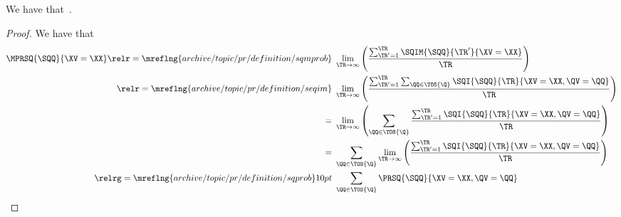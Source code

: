 \begin{proposition}
  We have that\ \mprsqexprprop.%
\end{proposition}

\begin{proof}
  We have that
  \begin{align*}
  \MPRSQ{\SQQ}{\XV = \XX}
                    \relr = {\mreflng{archive/topic/pr/definition/sqmprob}} \ & 
                    \lim_{\TR \rightarrow \infty}\left(\frac{\sum_{\TR' = 1}^{\TR}\SQIM{\SQQ}{\TR'}{\XV = \XX}}{\TR}\right)\\
                    \relr = {\mreflng{archive/topic/pr/definition/seqim}} \ & 
                    \lim_{\TR \rightarrow \infty}\left(\frac{\sum_{\TR' = 1}^{\TR}\sum_{\QQ \in \TOS{\Q}} \SQI{\SQQ}{\TR}{\XV = \XX, \QV = \QQ}}{\TR}\right)\\
                    = \ & 
                    \lim_{\TR \rightarrow \infty}\left(\sum_{\QQ \in \TOS{\Q}} \frac{\sum_{\TR' = 1}^{\TR}\SQI{\SQQ}{\TR}{\XV = \XX, \QV = \QQ}}{\TR}\right)\\
                    = \ & 
                    \sum_{\QQ \in \TOS{\Q}} \lim_{\TR \rightarrow \infty}\left(\frac{\sum_{\TR' = 1}^{\TR}\SQI{\SQQ}{\TR}{\XV = \XX, \QV = \QQ}}{\TR}\right)\\
                    \relrg = {\mreflng{archive/topic/pr/definition/sqprob}} 10pt \ & 
                    \sum_{\QQ \in \TOS{\Q}}\PRSQ{\SQQ}{\XV = \XX, \QV = \QQ}
  \end{align*}
\end{proof}
